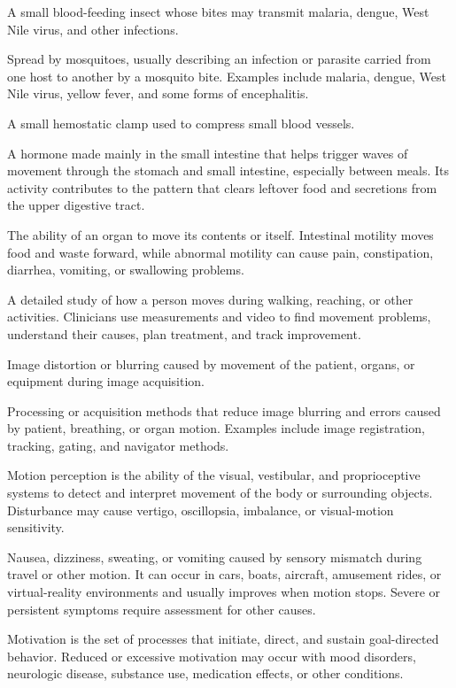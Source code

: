  A small blood-feeding insect whose bites may transmit malaria, dengue, West Nile virus, and other infections.

 Spread by mosquitoes, usually describing an infection or parasite carried from one host to another by a mosquito bite. Examples include malaria, dengue, West Nile virus, yellow fever, and some forms of encephalitis.

 A small hemostatic clamp used to compress small blood vessels.

 A hormone made mainly in the small intestine that helps trigger waves of movement through the stomach and small intestine, especially between meals. Its activity contributes to the pattern that clears leftover food and secretions from the upper digestive tract.

 The ability of an organ to move its contents or itself. Intestinal motility moves food and waste forward, while abnormal motility can cause pain, constipation, diarrhea, vomiting, or swallowing problems.

 A detailed study of how a person moves during walking, reaching, or other activities. Clinicians use measurements and video to find movement problems, understand their causes, plan treatment, and track improvement.

 Image distortion or blurring caused by movement of the patient, organs, or equipment during image acquisition.

 Processing or acquisition methods that reduce image blurring and errors caused by patient, breathing, or organ motion. Examples include image registration, tracking, gating, and navigator methods.

 Motion perception is the ability of the visual, vestibular, and proprioceptive systems to detect and interpret movement of the body or surrounding objects. Disturbance may cause vertigo, oscillopsia, imbalance, or visual-motion sensitivity.

 Nausea, dizziness, sweating, or vomiting caused by sensory mismatch during travel or other motion. It can occur in cars,
boats, aircraft, amusement rides, or virtual-reality environments and usually improves when motion stops.
Severe or persistent symptoms require assessment for other causes.

 Motivation is the set of processes that initiate, direct, and sustain goal-directed behavior. Reduced or excessive motivation may occur with mood disorders, neurologic disease, substance use, medication effects, or other conditions.


